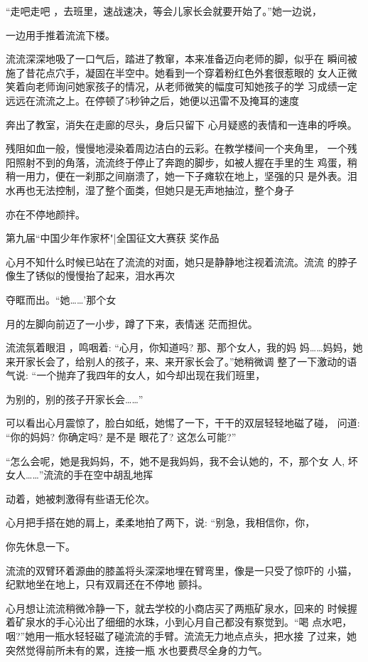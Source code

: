 \documentclass{article}
\begin{document}
“走吧走吧 ，去班里，速战速决，等会儿家长会就要开始了。”她一边说，

一边用手推着流流下楼。 

流流深深地吸了一口气后，踏进了教窜，本来准备迈向老师的脚，似乎在
瞬间被施了昔花点穴手，凝固在半空中。她看到一个穿着粉红色外套很惹眼的
女人正微笑着向老师询问她家孩子的情况，从老师微笑的幅度可知她孩子的学
习成绩一定远远在流流之上。在停顿了5秒钟之后，她便以迅雷不及掩耳的速度
\newpage

奔出了教室，消失在走廊的尽头，身后只留下
心月疑惑的表情和一连串的呼唤。 

残阻如血一般，慢慢地浸染着周边洁白的云彩。在教学楼间一个夹角里，
一个残阳照射不到的角落，流流终于停止了奔跑的脚步，如被人握在手里的生
鸡蛋，稍稍一用力，便在一刹那之间崩溃了，她一下子瘫软在地上，坚强的只
是外表。泪水再也无法控制，湿了整个面类，但她只是无声地抽泣，整个身子

亦在不停地颜拌。 


第九届“中国少年作家杯"|全国征文大赛获
奖作品 

心月不知什么时候已站在了流流的对面，她只是静静地注视着流流。流流
的脖子像生了锈似的慢慢抬了起来，泪水再次

\newpage
夺眶而出。“她……'那个女 

月的左脚向前迈了一小步，蹲了下来，表情迷
茫而担优。 

流流氛着眼泪 ，鸣咽着: “心月，你知道吗? 那、那个女人，我的妈
妈……妈妈，她来开家长会了，给别人的孩子，来、来开家长会了。”她稍微调
整了一下激动的语气说: “一个抛弃了我四年的女人，如今却出现在我们班里，

为别的，别的孩子开家长会……” 

可以看出心月震惊了，脸白如纸，她惕了一下，干干的双层轻轻地磁了碰，
问道: “你的妈妈? 你确定吗? 是不是
眼花了? 这怎么可能?” 

“怎么会呢，她是我妈妈，不，她不是我妈妈，我不会认她的，不，那个女
人, 坏女人……”流流的手在空中胡乱地挥

\newpage
动着，她被刺激得有些语无伦次。 

心月把手搭在她的肩上，柔柔地拍了两下，说: “别急，我相信你，你，

你先休息一下。 

流流的双臂环着源曲的膝盖将头深深地埋在臂弯里，像是一只受了惊吓的
小猫，纪默地坐在地上，只有双肩还在不停地
颤抖。 

心月想让流流稍微冷静一下，就去学校的小商店买了两瓶矿泉水，回来的
时候握着矿泉水的手心沁出了细细的水珠，小到心月自己都没有察觉到。“喝
点水吧，咽?”她用一瓶水轻轻磁了碰流流的手臂。流流无力地点点头，把水接
了过来，她突然觉得前所未有的累，连接一瓶
水也要费尽全身的力气。 
\end{document}
